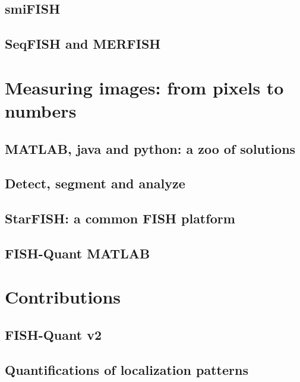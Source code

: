 \subsection{\ac{smiFISH}}

\subsection{\ac{SeqFISH} and \ac{MERFISH}}


\section{Measuring images: from pixels to numbers}


\subsection{MATLAB, java and python: a zoo of solutions}

\subsection{Detect, segment and analyze}

\subsection{StarFISH: a common \ac{FISH} platform}

\subsection{FISH-Quant MATLAB}


\section{Contributions}


\subsection{FISH-Quant v2}

\subsection{Quantifications of localization patterns}

